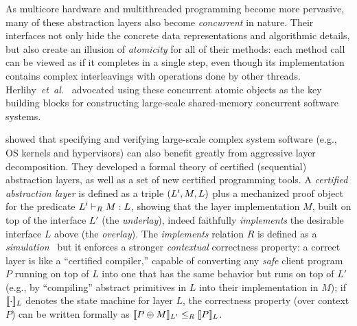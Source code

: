 {As multicore hardware and multithreaded programming become more
pervasive, many of these abstraction layers also become {\em
  concurrent} in nature.  Their interfaces not only hide the concrete
data representations and algorithmic details, but also create an
illusion of {\em atomicity} for all of their methods: each method call
can be viewed as if it completes in a single step, even though its
implementation contains complex interleavings with operations done by
other threads.  Herlihy~{\em{}et~al.}~\cite{herlihy90,Herlihy08book}
advocated using these concurrent atomic objects as the key building
blocks for constructing large-scale shared-memory concurrent software
systems.

\citet{dscal15} showed that specifying and verifying large-scale
complex system software (e.g., OS kernels and hypervisors) can also
benefit greatly from aggressive layer decomposition. They developed a
formal theory of certified (sequential) abstraction layers, as well as a
set of new certified programming tools.  A {\em certified abstraction
  layer} is defined as a triple $\layer{L'}{M}{L}$ plus a mechanized
proof object for the predicate $\ltyp{L'}{R}{M}{L}$, showing that the layer
implementation $M$, built on top of the interface $L'$ (the {\em
  underlay}), indeed faithfully {\em implements} the desirable
interface $L$ above (the {\em overlay}).  The {\em implements}
relation $R$ is defined as a {\em simulation}~\cite{Lynch95} but it
enforces a stronger {\em contextual} correctness property: a correct
layer is like a ``certified compiler,'' capable of converting any {\em
  safe} client program $P$ running on top of $L$ into one that has the
same behavior but runs on top of $L'$ (e.g., by ``compiling'' abstract
primitives in $L$ into their implementation in $M$); if
$\sem{L}{\cdot}$ denotes the state machine for layer $L$, the
correctness property (over context $P$) can be written formally as
$\sem{L'}{P\oplus{}M} \leq_R \sem{L}{P}$.

}
